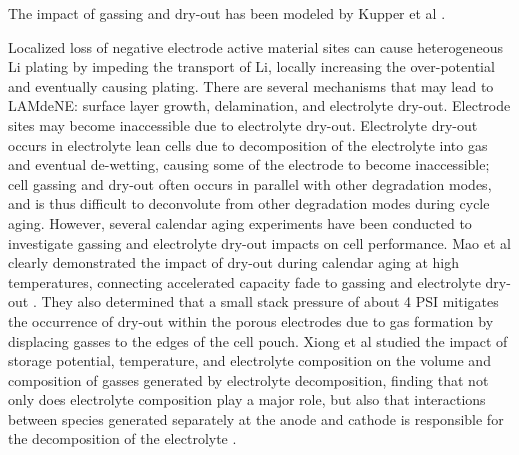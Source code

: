 \documentclass{article}
\begin{document}
The impact of gassing and dry-out has been modeled by Kupper et al \cite{kupper_end--life_2018}.

Localized loss of negative electrode active material sites can cause heterogeneous Li plating by impeding the transport of Li, locally increasing the over-potential and eventually causing plating. There are several mechanisms that may lead to LAMdeNE: surface layer growth, delamination, and electrolyte dry-out. 
Electrode sites may become inaccessible due to electrolyte dry-out. Electrolyte dry-out occurs in electrolyte lean cells due to decomposition of the electrolyte into gas and eventual de-wetting, causing some of the electrode to become inaccessible; cell gassing and dry-out often occurs in parallel with other degradation modes, and is thus difficult to deconvolute from other degradation modes during cycle aging. However, several calendar aging experiments have been conducted to investigate gassing and electrolyte dry-out impacts on cell performance. Mao et al clearly demonstrated the impact of dry-out during calendar aging at high temperatures, connecting accelerated capacity fade to gassing and electrolyte dry-out \cite{mao_calendar_2017}. They also determined that a small stack pressure of about 4 PSI mitigates the occurrence of dry-out within the porous electrodes due to gas formation by displacing gasses to the edges of the cell pouch. Xiong et al studied the impact of storage potential, temperature, and electrolyte composition on the volume and composition of gasses generated by electrolyte decomposition, finding that not only does electrolyte composition play a major role, but also that interactions between species generated separately at the anode and cathode is responsible for the decomposition of the electrolyte \cite{xiong_studies_2017}.
\end{document}
